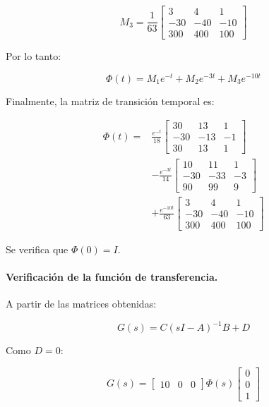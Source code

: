 \documentclass[12pt,a4paper]{article}
\begin{document}
\begin{equation}M_3=\frac{1}{63} \begin{bmatrix}3&4&1\\-30&-40&-10\\300&400&100\end{bmatrix}\end{equation}

Por lo tanto:

\begin{equation}\Phi(t)=M_1e^{-t}+M_2e^{-3t}+M_3e^{-10t}\end{equation}

Finalmente, la matriz de transición temporal es:

\begin{equation}\boxed{\begin{aligned}\Phi(t)={}&\frac{e^{-t}}{18} \begin{bmatrix}30&13&1\\-30&-13&-1\\30&13&1\end{bmatrix}\\[6pt]&-\frac{e^{-3t}}{14} \begin{bmatrix}10&11&1\\-30&-33&-3\\90&99&9\end{bmatrix}\\[6pt]&+\frac{e^{-10t}}{63} \begin{bmatrix}3&4&1\\-30&-40&-10\\300&400&100\end{bmatrix}\end{aligned}}\end{equation}

Se verifica que $\Phi(0)=I$.
\paragraph{Verificación de la función de transferencia.} A partir de las matrices obtenidas:

\begin{equation}G(s)=C(sI-A)^{-1}B+D\end{equation}

Como $D=0$:

\begin{equation}G(s)=\begin{bmatrix}10&0&0\end{bmatrix} \Phi(s) \begin{bmatrix}0\\0\\1\end{bmatrix}\end{equation}
\end{document}
